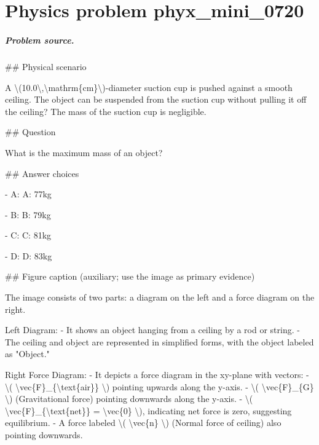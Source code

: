 
\chapter{Physics problem phyx\_mini\_0720}
\label{ch:PhyXMiniProblems_problem_phyx_mini_0720}

\paragraph{Problem source.}
\#\# Physical scenario

A \textbackslash{}(10.0\textbackslash{},\textbackslash{}mathrm\{cm\}\textbackslash{})-diameter suction cup is pushed against a smooth ceiling. The object can be suspended from the suction cup without pulling it off the ceiling? The mass of the suction cup is negligible.

\#\# Question

What is the maximum mass of an object?

\#\# Answer choices

- A: A: 77kg

- B: B: 79kg

- C: C: 81kg

- D: D: 83kg

\#\# Figure caption (auxiliary; use the image as primary evidence)

The image consists of two parts: a diagram on the left and a force diagram on the right.

Left Diagram:
- It shows an object hanging from a ceiling by a rod or string.
- The ceiling and object are represented in simplified forms, with the object labeled as "Object."

Right Force Diagram:
- It depicts a force diagram in the xy-plane with vectors:
  - \textbackslash{}( \textbackslash{}vec\{F\}\_\{\textbackslash{}text\{air\}\} \textbackslash{}) pointing upwards along the y-axis.
  - \textbackslash{}( \textbackslash{}vec\{F\}\_\{G\} \textbackslash{}) (Gravitational force) pointing downwards along the y-axis.
  - \textbackslash{}( \textbackslash{}vec\{F\}\_\{\textbackslash{}text\{net\}\} = \textbackslash{}vec\{0\} \textbackslash{}), indicating net force is zero, suggesting equilibrium.
  - A force labeled \textbackslash{}( \textbackslash{}vec\{n\} \textbackslash{}) (Normal force of ceiling) also pointing downwards.

